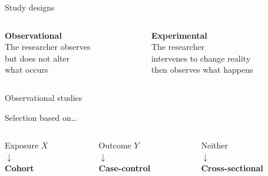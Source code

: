 \begin{frame}{Study designs}
    \begin{columns}[t]
        \begin{column}{0.5\textwidth}
            \begin{center}
                \textbf{Observational} \\[1em]
                The researcher observes \\
                \alert{but does not alter} \\
                what occurs
            \end{center}
        \end{column}
        \begin{column}{0.5\textwidth}
            \begin{center}
                \textbf{Experimental} \\[1em]
                The researcher \\
                \alert{intervenes to change reality}
                \\ then observes what happens
            \end{center}
        \end{column}
    \end{columns}
\end{frame}

\begin{frame}{Observational studies}
    \begin{center}
        Selection based on\ldots
    \end{center}
    \begin{columns}[t]
        \begin{column}{0.33\textwidth}
            \centering
            Exposure $X$ \\[\bigskipamount]
            $\downarrow$ \\[\bigskipamount]
            \textbf{Cohort}
        \end{column}
        \begin{column}{0.33\textwidth}
            \centering
            Outcome $Y$ \\[\bigskipamount]
            $\downarrow$ \\[\bigskipamount]
            \textbf{Case\hyp{}control}
        \end{column}
        \begin{column}{0.33\textwidth}
            \centering
            Neither \\[\bigskipamount]
            $\downarrow$ \\[\bigskipamount]
            \textbf{Cross\hyp{}sectional}
        \end{column}
    \end{columns}
\end{frame}


